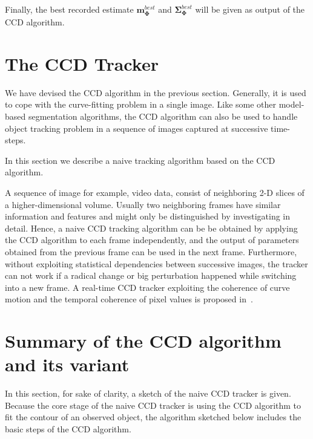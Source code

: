 Finally, the best recorded estimate
$\mathbf{m}_{\mathbf{\Phi}}^{best}$ and
$\mathbf{\Sigma}_{\mathbf{\Phi}}^{best}$ will be given as output of the
CCD algorithm.


\section{The CCD Tracker}
\label{sec:vg}

We have devised the CCD algorithm in the previous section. Generally,
it is used to cope with the curve-fitting problem in a single
image. Like some other model-based segmentation algorithms, the CCD
algorithm can also be used to handle object tracking problem in a
sequence of images captured at successive time-steps. %

In this section we describe a naive tracking algorithm based on the CCD
algorithm.

A sequence of image for example, video data, consist of neighboring 2-D slices of a
higher-dimensional volume. Usually two neighboring frames have similar
information and features and might only be distinguished by
investigating in detail. Hence, a naive CCD tracking algorithm can be
 be obtained by applying the CCD algorithm to each frame
 independently, and the output of parameters obtained from  the
 previous frame can be used in the next frame. %
 Furthermore, without exploiting
 statistical dependencies between successive images, the tracker can
 not work if a radical change or big perturbation happened while
 switching into a new frame. A real-time CCD tracker exploiting the
 coherence of curve motion and the temporal coherence of pixel values
 is proposed in~\cite{hanek2004fitting}. 


\section{Summary of the CCD algorithm and its variant}
\label{sec:sccd}
In this section,  for sake of clarity, a sketch of the naive CCD
tracker is given. Because the core stage of the naive CCD tracker
is using the CCD algorithm to fit the contour of an observed
object, the algorithm sketched below includes the basic steps of the CCD
algorithm.

